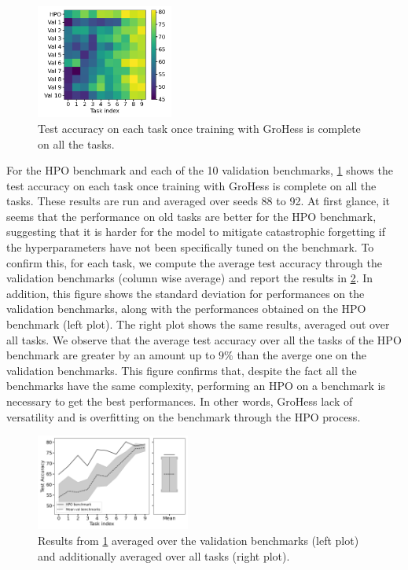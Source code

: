 \documentclass[11pt]{article}
\begin{document}
\begin{figure}
    \centering
    \includegraphics[width=0.4\textwidth]{images/val_accs_matrix.png}
    \caption{Test accuracy on each task once training with GroHess is complete on all the tasks.}
    \label{fig:val_accs_matrix}
\end{figure}

\vspace{2mm}
\noindent
For the HPO benchmark and each of the 10 validation benchmarks, \ref{fig:val_accs_matrix} shows the test accuracy on each task once training with GroHess is complete on all the tasks. These results are run and averaged over seeds 88 to 92. At first glance, it seems that the performance on old tasks are better for the HPO benchmark, suggesting that it is harder for the model to mitigate catastrophic forgetting if the hyperparameters have not been specifically tuned on the benchmark. To confirm this, for each task, we compute the average test accuracy through the validation benchmarks (column wise average) and report the results in \ref{fig:accuracy_through_benchmarks}. In addition, this figure shows the standard deviation for performances on the validation benchmarks, along with the performances obtained on the HPO benchmark (left plot). The right plot shows the same results, averaged out over all tasks. We observe that the average test accuracy over all the tasks of the HPO benchmark are greater by an amount up to $9\%$ than the averge one on the validation benchmarks. This figure confirms that, despite the fact all the benchmarks have the same complexity, performing an HPO on a benchmark is necessary to get the best performances. In other words, GroHess lack of versatility and is overfitting on the benchmark through the HPO process.

\begin{figure}
    \centering
    \includegraphics[width=0.45\textwidth]{images/accuracy_through_benchmarks.png}
    \caption{Results from \ref{fig:val_accs_matrix} averaged over the validation benchmarks (left plot) and additionally averaged over all tasks (right plot).}
    \label{fig:accuracy_through_benchmarks}
\end{figure}
\end{document}
